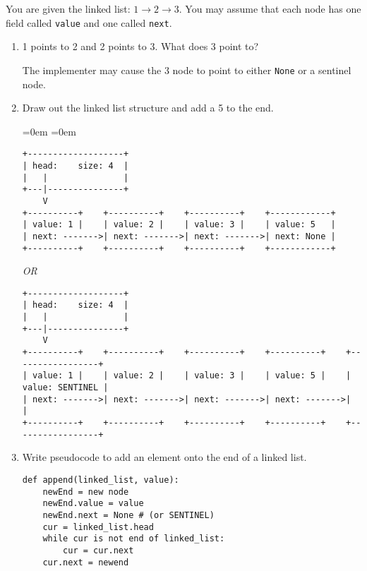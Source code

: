 %
%


You are given the linked list: $1 \rightarrow 2 \rightarrow 3$.  You may assume that each node has one field called \texttt{value} and one called \texttt{next}.
        \begin{enumerate}
            \item 1 points to 2 and 2 points to 3. What does 3 point to? \\
                \begin{answer}
				The implementer may cause the 3 node to point to either \texttt{None} or a sentinel node.
				\end{answer}
            \item Draw out the linked list structure and add a 5 to the end.
				\begin{answer}
				\leftmargin=0em
				\itemindent=0em
				{ \small
				\begin{verbatim}
+-------------------+
| head:    size: 4  |
|   |               |
+---|---------------+
    V
+----------+    +----------+    +----------+    +------------+
| value: 1 |    | value: 2 |    | value: 3 |    | value: 5   |
| next: ------->| next: ------->| next: ------->| next: None |
+----------+    +----------+    +----------+    +------------+
				\end{verbatim}
				\textit{OR}
				\begin{verbatim}
+-------------------+
| head:    size: 4  |
|   |               |
+---|---------------+
    V
+----------+    +----------+    +----------+    +----------+    +-----------------+
| value: 1 |    | value: 2 |    | value: 3 |    | value: 5 |    | value: SENTINEL |
| next: ------->| next: ------->| next: ------->| next: ------->|                 |
+----------+    +----------+    +----------+    +----------+    +-----------------+
				\end{verbatim} }
				\end{answer}
            \item Write pseudocode to add an element onto the end of a linked list.
				\begin{answer}
				\begin{lstlisting}[numbers=none]
def append(linked_list, value):
	newEnd = new node
	newEnd.value = value
	newEnd.next = None # (or SENTINEL)
	cur = linked_list.head
	while cur is not end of linked_list:
		cur = cur.next
	cur.next = newend
				\end{lstlisting}
				\end{answer}

\end{enumerate}
